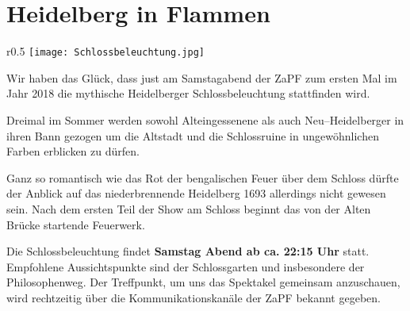 
\section{Heidelberg in Flammen} %

\begin{wrapfigure}{r}{0.5\textwidth}
\texttt{[image: Schlossbeleuchtung.jpg]}
\end{wrapfigure}
Wir haben das Glück, dass just am Samstagabend der ZaPF zum ersten Mal im Jahr 2018 die mythische Heidelberger Schlossbeleuchtung stattfinden wird.

Dreimal im Sommer werden sowohl Alteingessenene als auch Neu--Heidelberger in ihren Bann gezogen um die Altstadt und die Schlossruine in ungewöhnlichen Farben erblicken zu dürfen.

Ganz so romantisch wie das Rot der bengalischen Feuer über dem Schloss dürfte der Anblick auf das niederbrennende Heidelberg 1693 allerdings nicht gewesen sein. Nach dem ersten Teil der Show am Schloss beginnt das von der Alten Brücke startende Feuerwerk. 

Die Schlossbeleuchtung findet \textbf{Samstag Abend ab ca. 22:15 Uhr} statt. Empfohlene Aussichtspunkte sind der Schlossgarten und insbesondere der Philosophenweg. Der Treffpunkt, um uns das Spektakel gemeinsam anzuschauen, wird rechtzeitig über die Kommunikationskanäle der ZaPF bekannt gegeben.
